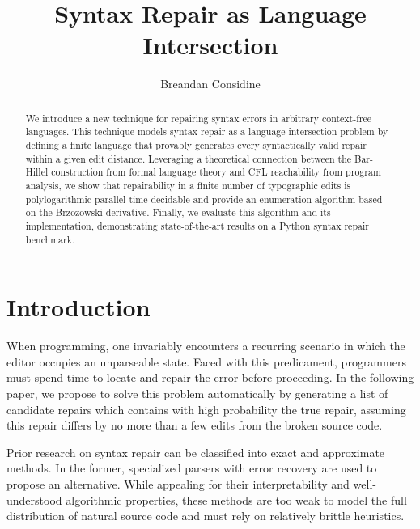 \documentclass[sigplan,review,acmsmall,nonacm,screen,anonymous]{acmart}\settopmatter{printfolios=false,printccs=false,printacmref=false}
\begin{document}
%
\title{Syntax Repair as Language Intersection}
%
\begin{abstract}
We introduce a new technique for repairing syntax errors in arbitrary context-free languages. This technique models syntax repair as a language intersection problem by defining a finite language that provably generates every syntactically valid repair within a given edit distance. Leveraging a theoretical connection between the Bar-Hillel construction from formal language theory and CFL reachability from program analysis, we show that repairability in a finite number of typographic edits is polylogarithmic parallel time decidable and provide an enumeration algorithm based on the Brzozowski derivative. Finally, we evaluate this algorithm and its implementation, demonstrating state-of-the-art results on a Python syntax repair benchmark.
\end{abstract}

\author{Breandan Considine}

\maketitle

\section{Introduction}

When programming, one invariably encounters a recurring scenario in which the editor occupies an unparseable state. Faced with this predicament, programmers must spend time to locate and repair the error before proceeding. In the following paper, we propose to solve this problem automatically by generating a list of candidate repairs which contains with high probability the true repair, assuming this repair differs by no more than a few edits from the broken source code.

Prior research on syntax repair can be classified into exact and approximate methods. In the former, specialized parsers with error recovery are used to propose an alternative. While appealing for their interpretability and well-understood algorithmic properties, these methods are too weak to model the full distribution of natural source code and must rely on relatively brittle heuristics.
\end{document}
